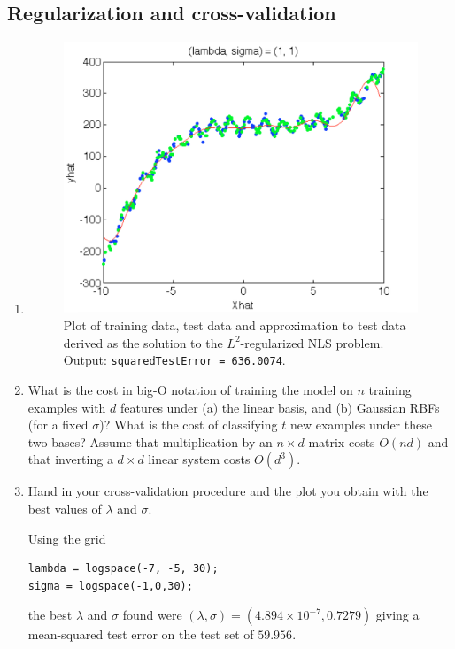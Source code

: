 \documentclass{article}
\begin{document}
\begin{enumerate}
\end{enumerate}


\subsection{Regularization and cross-validation}
\label{sec:regul-cross-valid}

\begin{enumerate}
\item

  

  \begin{figure}[h]
    \centering
    \includegraphics[width=.5\textwidth]{./fig/nonlinearLS-121.png}
    \caption{Plot of {\color{blue}training data}, {\color{green}test data} and {\color{red}approximation
      to test data} derived as the solution to the $L^2$-regularized NLS
      problem. Output: \texttt{squaredTestError = 636.0074}.}
    \label{fig:rbfnonlinear}
  \end{figure}
\item What is the cost in big-O notation of
training the model on $n$ training examples with $d$ features under (a) the linear basis, and (b) Gaussian
RBFs (for a fixed $\sigma$)? What is the cost of classifying $t$ new examples under these two bases? Assume
that multiplication by an $n\times d$ matrix costs $O(nd)$ and that inverting a
$d\times d$ linear system costs $O(d^3)$.
\item Hand in your cross-validation procedure and the plot you obtain with the
  best values of $\lambda$ and $\sigma$.

  Using the grid
\begin{verbatim}
lambda = logspace(-7, -5, 30);
sigma = logspace(-1,0,30);
\end{verbatim}
  the best $\lambda$ and $\sigma$ found were
  $(\lambda, \sigma) = (4.894\times 10^{-7}, 0.7279)$ giving a mean-squared test
  error on the test set of $59.956$.
  

\end{enumerate}
\end{document}
